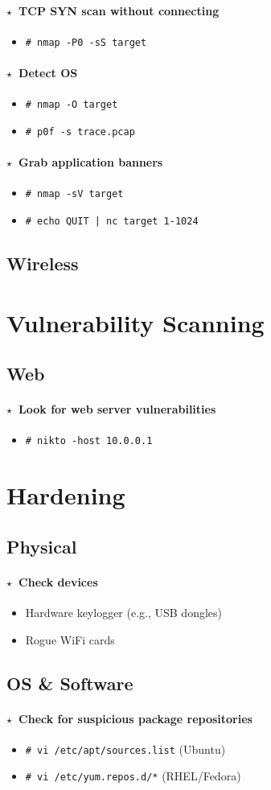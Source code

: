 \documentclass[10pt,landscape]{article}
\newcommand{\os}[1]{\texttt{\footnotesize{#1}}}
\newcommand{\unix}{\os{U}}
\newcommand{\linux}{\os{L}}
\newenvironment{action}[1]
  {\paragraph{$\star$~#1}\begin{itemize}[leftmargin=1cm]}
  {\end{itemize}}
\newcommand{\cmd}[2]{\item[#1] {\small\tt\# #2}}
\newcommand{\comment}[1]{\textrm{\small(#1)}}
\newcommand{\bulletpoint}[1]{\item {\small #1}}
\begin{document}
\begin{multicols*}{3}
\begin{action}{TCP SYN scan without connecting}
\cmd{\unix}{nmap -P0 -sS target}
\end{action}

\begin{action}{Detect OS}
\cmd{\unix}{nmap -O target}
\cmd{\unix}{p0f -s trace.pcap}
\end{action}

\begin{action}{Grab application banners}
\cmd{\unix}{nmap -sV target}
\cmd{\unix}{echo QUIT | nc target 1-1024}
\end{action}

\subsection*{Wireless}

\section*{Vulnerability Scanning}

\subsection*{Web}
\begin{action}{Look for web server vulnerabilities}
\cmd{\unix}{nikto -host 10.0.0.1}
\end{action}

\section*{Hardening}

\subsection*{Physical}

\begin{action}{Check devices}
\bulletpoint{Hardware keylogger (e.g., USB dongles)}
\bulletpoint{Rogue WiFi cards}

\end{action}

\subsection*{OS \& Software}

\begin{action}{Check for suspicious package repositories}
\cmd{\linux}{vi /etc/apt/sources.list} \comment{Ubuntu}
\cmd{\linux}{vi /etc/yum.repos.d/*} \comment{RHEL/Fedora}
\end{action}


\end{multicols*}
\end{document}
